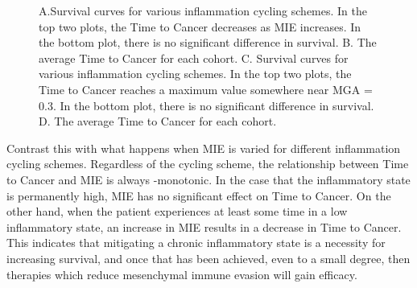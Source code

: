 \documentclass[11pt, a4paper, preprint]{article}
\begin{document}
\begin{figure}[H]
\center
{}
\caption{A.Survival curves for various inflammation cycling schemes. In the top two plots, the Time to Cancer decreases as MIE increases. In the bottom plot, there is no significant difference in survival.
B. The average Time to Cancer for each cohort.
C. Survival curves for various inflammation cycling schemes. In the top two plots, the Time to Cancer reaches a maximum value somewhere near MGA = 0.3. In the bottom plot, there is no significant difference in survival.
D. The average Time to Cancer for each cohort.}
\label{fig:VaryINFL_and_MesPars}
\end{figure}

Contrast this with what happens when MIE is varied for different inflammation cycling schemes.
Regardless of the cycling scheme, the relationship between Time to Cancer and MIE is always -monotonic.
In the case that the inflammatory state is permanently high, MIE has no significant effect on Time to Cancer.
On the other hand, when the patient experiences at least some time in a low inflammatory state, an increase in MIE results in a decrease in Time to Cancer.
This indicates that mitigating a chronic inflammatory state is a necessity for increasing survival, and once that has been achieved, even to a small degree, then therapies which reduce mesenchymal immune evasion will gain efficacy.


\end{document}
